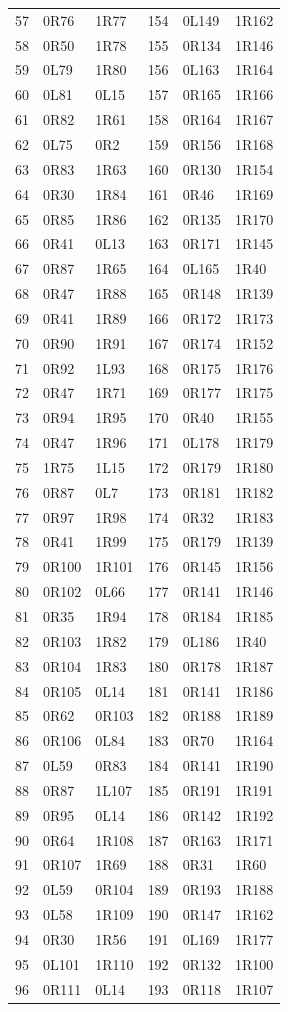 \begin{longtable}{rll@{\qquad}rll}
57 & 0R76 & 1R77 & 154 & 0L149 & 1R162\\
58 & 0R50 & 1R78 & 155 & 0R134 & 1R146\\
59 & 0L79 & 1R80 & 156 & 0L163 & 1R164\\
60 & 0L81 & 0L15 & 157 & 0R165 & 1R166\\
61 & 0R82 & 1R61 & 158 & 0R164 & 1R167\\
62 & 0L75 & 0R2 & 159 & 0R156 & 1R168\\
63 & 0R83 & 1R63 & 160 & 0R130 & 1R154\\
64 & 0R30 & 1R84 & 161 & 0R46 & 1R169\\
65 & 0R85 & 1R86 & 162 & 0R135 & 1R170\\
66 & 0R41 & 0L13 & 163 & 0R171 & 1R145\\
67 & 0R87 & 1R65 & 164 & 0L165 & 1R40\\
68 & 0R47 & 1R88 & 165 & 0R148 & 1R139\\
69 & 0R41 & 1R89 & 166 & 0R172 & 1R173\\
70 & 0R90 & 1R91 & 167 & 0R174 & 1R152\\
71 & 0R92 & 1L93 & 168 & 0R175 & 1R176\\
72 & 0R47 & 1R71 & 169 & 0R177 & 1R175\\
73 & 0R94 & 1R95 & 170 & 0R40 & 1R155\\
74 & 0R47 & 1R96 & 171 & 0L178 & 1R179\\
75 & 1R75 & 1L15 & 172 & 0R179 & 1R180\\
76 & 0R87 & 0L7 & 173 & 0R181 & 1R182\\
77 & 0R97 & 1R98 & 174 & 0R32 & 1R183\\
78 & 0R41 & 1R99 & 175 & 0R179 & 1R139\\
79 & 0R100 & 1R101 & 176 & 0R145 & 1R156\\
80 & 0R102 & 0L66 & 177 & 0R141 & 1R146\\
81 & 0R35 & 1R94 & 178 & 0R184 & 1R185\\
82 & 0R103 & 1R82 & 179 & 0L186 & 1R40\\
83 & 0R104 & 1R83 & 180 & 0R178 & 1R187\\
84 & 0R105 & 0L14 & 181 & 0R141 & 1R186\\
85 & 0R62 & 0R103 & 182 & 0R188 & 1R189\\
86 & 0R106 & 0L84 & 183 & 0R70 & 1R164\\
87 & 0L59 & 0R83 & 184 & 0R141 & 1R190\\
88 & 0R87 & 1L107 & 185 & 0R191 & 1R191\\
89 & 0R95 & 0L14 & 186 & 0R142 & 1R192\\
90 & 0R64 & 1R108 & 187 & 0R163 & 1R171\\
91 & 0R107 & 1R69 & 188 & 0R31 & 1R60\\
92 & 0L59 & 0R104 & 189 & 0R193 & 1R188\\
93 & 0L58 & 1R109 & 190 & 0R147 & 1R162\\
94 & 0R30 & 1R56 & 191 & 0L169 & 1R177\\
95 & 0L101 & 1R110 & 192 & 0R132 & 1R100\\
96 & 0R111 & 0L14 & 193 & 0R118 & 1R107\\
\end{longtable}\endgroup
\clearpage

